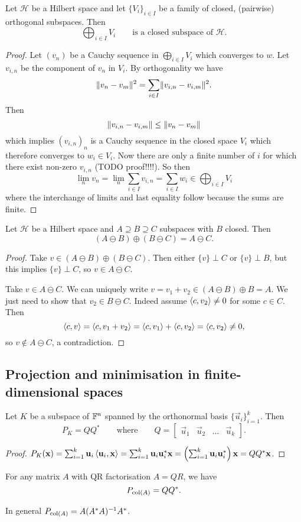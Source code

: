 \begin{proposition} \label{prop:directSumOrthogonalClosed}
Let $\mathcal{H}$ be a Hilbert space and let $\{V_i\}_{i\in I}$ be a family of closed, (pairwise) orthogonal subspaces. Then
\[ \bigoplus_{i\in I}V_i \qquad \text{is a closed subspace of $\mathcal{H}$.} \]
\end{proposition}
\begin{proof}
Let $(v_n)$ be a Cauchy sequence in $\bigoplus_{i\in I}V_i$ which converges to $w$. Let $v_{i,n}$ be the component of $v_n$ in $V_i$. By orthogonality we have
\[ \lVert v_n-v_m\rVert^2 = \sum_{i\in I}\lVert v_{i,n}-v_{i,m}\rVert^2. \]
Then
\[ \lVert v_{i,n}-v_{i,m}\rVert \leq \lVert v_n-v_m\rVert \]
which implies $(v_{i,n})_n$ is a Cauchy sequence in the closed space $V_i$ which therefore converges to $w_i\in V_i$. Now there are only a finite number of $i$ for which there exist non-zero $v_{i,n}$ (TODO proof!!!!). So then
\[ \lim_n v_n = \lim_n \sum_{i\in I}v_{i,n} = \sum_{i\in I}w_i \in \bigoplus_{i\in I}V_i \]
where the interchange of limits and last equality follow because the sums are finite.
\end{proof}

\begin{lemma} \label{lemma:cancellationOminus}
Let $\mathcal{H}$ be a Hilbert space and $A\supseteq B \supseteq C$ subspaces with $B$ closed. Then
\[ (A\ominus B)\oplus (B\ominus C) = A\ominus C.\]
\end{lemma}
\begin{proof}
Take $v\in(A\ominus B)\oplus (B\ominus C)$. Then either $\{v\}\perp C$ or $\{v\}\perp B$, but this implies $\{v\}\perp C$, so $v\in A\ominus C$.

Take $v\in A\ominus C$. We can uniquely write $v = v_1 + v_2 \in (A\ominus B)\oplus B = A$. We just need to show that $v_2\in B\ominus C$. Indeed assume $\left\langle c,v_2 \right\rangle\neq 0$ for some $c\in C$. Then
\[ \left\langle c, v \right\rangle = \left\langle c, v_1+v_2 \right\rangle = \left\langle c,v_1 \right\rangle+\left\langle c,v_2 \right\rangle = \left\langle c,v_2 \right\rangle \neq 0, \]
so $v\notin A\ominus C$, a contradiction.
\end{proof}

\subsection{Projection and minimisation in finite-dimensional spaces}

\begin{lemma}
Let $K$ be a subspace of $\mathbb{F}^n$ spanned by the orthonormal basis $\{\vec{u}_i\}_{i=1}^k$. Then
\[ P_K = QQ^* \qquad\text{where}\qquad Q = \begin{bmatrix}
\vec{u}_1 & \vec{u}_2 & \hdots & \vec{u}_k
\end{bmatrix}. \]
\end{lemma}
\begin{proof}
$P_K(\bm{\mathrm{x}}) = \sum_{i=1}^k\bm{\mathrm{u}}_i\left\langle \bm{\mathrm{u}}_i,\bm{\mathrm{x}} \right\rangle = \sum_{i=1}^k\bm{\mathrm{u}}_i \bm{\mathrm{u}}_i^*\bm{\mathrm{x}} = \left(\sum_{i=1}^k\bm{\mathrm{u}}_i \bm{\mathrm{u}}_i^*\right)\bm{\mathrm{x}} = QQ^*\bm{\mathrm{x}}$.
\end{proof}
\begin{corollary}
For any matrix $A$ with QR factorisation $A=QR$, we have
\[ P_{\operatorname{col}(A)} = QQ^*. \]
\end{corollary}
In general $P_{\operatorname{col}(A)} = A(A^*A)^{-1}A^*$.

